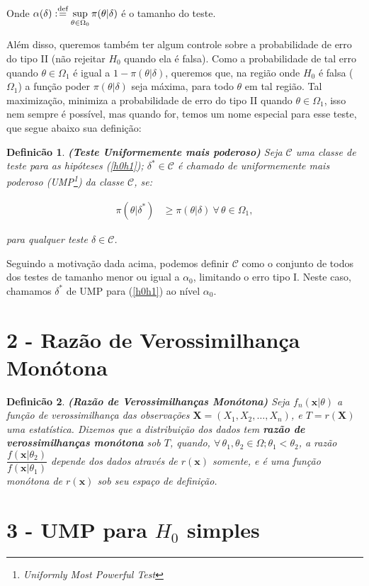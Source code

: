 \documentclass[a4paper,10pt, notitlepage]{report}
\newtheorem{defi}{Definicão}
\newcommand{\rs}{X_1, X_2, \ldots, X_n} %
\newcommand{\bX}{\boldsymbol{X}} %
\newcommand{\bx}{\boldsymbol{x}} %
\newcommand{\defn}{\stackrel{\textrm{\scriptsize def}}{=}}
\newcommand{\mysection}[2]{\setcounter{section}{#1}\addtocounter{section}{-1}\section*{#1 - #2}}
\begin{document}
	Onde $\displaystyle\alpha(\delta):\defn\sup_{\theta\in\Omega_0}\pi(\theta|\delta)$ é o tamanho do teste.
	
	
	
	Além disso, queremos também ter algum controle sobre a probabilidade de erro do tipo II (não rejeitar $H_0$ quando ela é falsa). Como a probabilidade de tal erro quando $\theta \in \Omega_1$ é igual a $1-\pi(\theta|\delta)$, queremos que, na região onde $H_0$ é falsa ($\Omega_1$) a função poder $\pi(\theta|\delta)$ seja máxima, para todo $\theta$ em tal região. Tal maximização, minimiza a probabilidade de erro do tipo II quando $\theta\in\Omega_1$, isso nem sempre é possível, mas quando for, temos um nome especial para esse teste, que segue abaixo sua definição:
	
	\begin{defi}
		\textbf{(Teste Uniformemente mais poderoso)}
		\label{ump} 
		Seja $\mathcal{C}$ uma classe de teste para as hipóteses (\ref{h0h1}); $\delta^*\in\mathcal{C}$ é chamado de uniformemente mais poderoso (UMP\footnote{Uniformly Most Powerful Test}) da classe $\mathcal{C}$, se:
		
		\begin{align*}\pi(\theta|\delta^*)&\geq\pi(\theta|\delta) ~\forall \,\theta \in \Omega_1,
		\end{align*}
		
		para qualquer teste $\delta\in\mathcal{C}$.
		
	\end{defi} 
	Seguindo a motivação dada acima, podemos definir $\mathcal{C}$ como o conjunto de todos dos testes de tamanho menor ou igual a $\alpha_0$, limitando o erro tipo I. Neste caso, chamamos $\delta^*$ de UMP para (\ref{h0h1}) ao nível $\alpha_0$.
	
	\mysection{2}{Razão de Verossimilhança Monótona}
	
	\begin{defi}
		\textbf{(Razão de Verossimilhanças Monótona)} Seja $f_n(\bx|\theta)$ a função de verossimilhança das observações $\bX = (\rs)$, e $T=r(\bX)$ uma estatística. Dizemos que a distribuição dos dados tem \textbf{razão de verossimilhanças monótona} sob $T$, quando, $\forall\,\theta_1,\theta_2\in\Omega; \theta_1<\theta_2$, a razão $\dfrac{f(\bx|\theta_2)}{f(\bx|\theta_1)}$ depende dos dados através de $r(\bx)$ somente, e é uma função monótona de $r(\bx)$ sob seu espaço de definição.
	\end{defi}

	\mysection{3}{UMP para $H_0$ simples}
	
\end{document}

